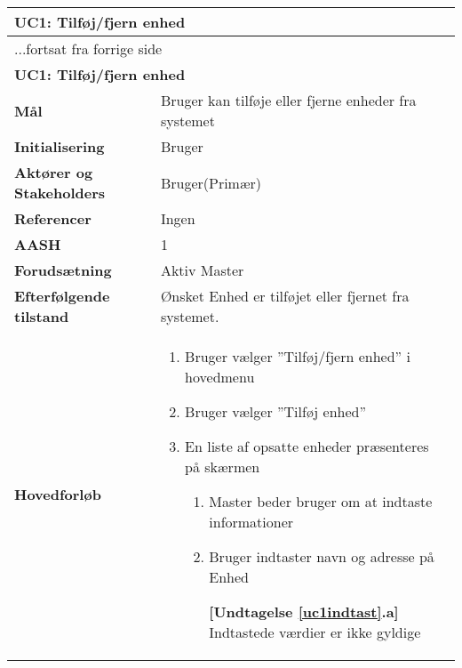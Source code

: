\begin{center} \centering \label{UC1}
	\begin{longtable}{|p{5cm}|p{9cm}|}  %
	\hline
		\multicolumn{2}{|l|}{\textbf{UC1: Tilføj\slash fjern enhed}} \\\hline %
		\endfirsthead
		
		\multicolumn{2}{l}{...fortsat fra forrige side} \\ \hline %
		\multicolumn{2}{|l|}{\textbf{UC1: Tilføj\slash fjern enhed}} \\\hline %
		\endhead	
		
		\textbf{Mål}								&Bruger kan tilføje eller fjerne enheder fra systemet			\\\hline
		\textbf{Initialisering}					&Bruger														\\\hline
		\textbf{Aktører og Stakeholders}			&Bruger(Primær)												\\\hline 
		\textbf{Referencer}						&Ingen														\\\hline
		\textbf{AASH}							&1															\\\hline
		\textbf{Forudsætning}					&Aktiv Master											\\\hline
		\textbf{Efterfølgende tilstand}			&Ønsket Enhed er tilføjet eller fjernet fra systemet.		\\\hline
		\textbf{Hovedforløb}					
			&\begin{enumerate}
	
				\item Bruger vælger ''Tilføj/fjern enhed'' i hovedmenu
				
				\item \label{uc1valg} Bruger vælger ''Tilføj enhed''
				
				\item En liste af opsatte enheder præsenteres på skærmen				
				
				\begin{enumerate}
					\item \label{uc1indtast} Master beder bruger om at indtaste informationer
					
					\item \label{uc1indtast_fejl} Bruger indtaster navn og adresse på Enhed
					
						\textbf{[Undtagelse \ref{uc1indtast}.a]} \newline
						Indtastede værdier er ikke gyldige
					

\end{enumerate}
\end{enumerate}
\end{longtable}
\end{center}
